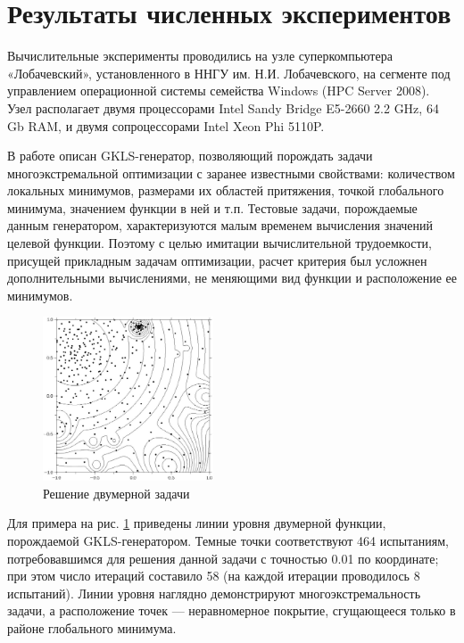 \documentclass[a4paper]{article}
\begin{document}
\section{Результаты численных экспериментов}
Вычислительные эксперименты проводились на узле суперкомпьютера «Лобачевский», установленного в ННГУ им. Н.И. Лобачевского, на сегменте под управлением операционной системы семейства Windows (HPC Server 2008). Узел располагает двумя процессорами Intel Sandy Bridge E5-2660 2.2 GHz, 64 Gb RAM, и двумя сопроцессорами Intel Xeon Phi 5110P.
\par
В работе \cite{gklsPaper} описан GKLS-генератор, позволяющий порождать задачи многоэкстремальной оптимизации с заранее известными свойствами: количеством локальных минимумов, размерами их областей притяжения, точкой глобального минимума, значением функции в ней и т.п. Тестовые задачи, порождаемые данным генератором, характеризуются малым временем вычисления значений целевой функции. Поэтому с целью имитации вычислительной трудоемкости, присущей прикладным задачам оптимизации, расчет критерия был усложнен дополнительными вычислениями, не меняющими вид функции и расположение ее минимумов.
\begin{figure}[h!]
    \centering
		\includegraphics[width=0.45\textwidth]{isolines.eps}
		\caption{Решение двумерной задачи}\label{fig:isolines}
\end{figure}
\par
Для примера на рис. \ref{fig:isolines} приведены линии уровня двумерной функции, порождаемой GKLS-генератором. Темные точки соответствуют 464 испытаниям, потребовавшимся для решения данной задачи с точностью 0.01 по координате; при этом число итераций составило 58 (на каждой итерации проводилось 8 испытаний). Линии уровня наглядно демонстрируют многоэкстремальность задачи, а расположение точек --- неравномерное покрытие, сгущающееся только в районе глобального минимума.
\par
\end{document}
